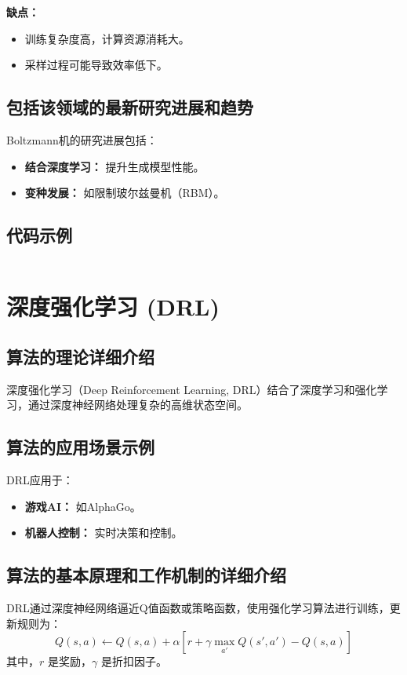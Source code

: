 \textbf{缺点：}
\begin{itemize}
    \item 训练复杂度高，计算资源消耗大。
    \item 采样过程可能导致效率低下。
\end{itemize}

\subsection*{包括该领域的最新研究进展和趋势}
Boltzmann机的研究进展包括：
\begin{itemize}
    \item \textbf{结合深度学习：} 提升生成模型性能。
    \item \textbf{变种发展：} 如限制玻尔兹曼机（RBM）。
\end{itemize}
\subsection*{代码示例}
\begin{lstlisting}

\end{lstlisting}


\section{深度强化学习 (DRL)}
\subsection*{算法的理论详细介绍}
深度强化学习（Deep Reinforcement Learning, DRL）结合了深度学习和强化学习，通过深度神经网络处理复杂的高维状态空间。

\subsection*{算法的应用场景示例}
DRL应用于：
\begin{itemize}
    \item \textbf{游戏AI：} 如AlphaGo。
    \item \textbf{机器人控制：} 实时决策和控制。
\end{itemize}

\subsection*{算法的基本原理和工作机制的详细介绍}
DRL通过深度神经网络逼近Q值函数或策略函数，使用强化学习算法进行训练，更新规则为：
\[
    Q(s, a) \leftarrow Q(s, a) + \alpha [r + \gamma \max_{a'} Q(s', a') - Q(s, a)]
\]
其中，\(r\) 是奖励，\(\gamma\) 是折扣因子。

